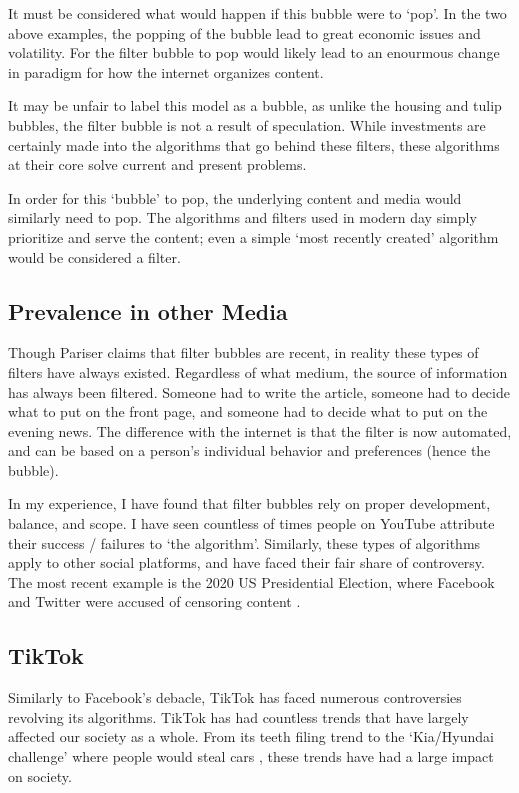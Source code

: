 \documentclass[12pt]{article}
\begin{document}
It must be considered what would happen if this bubble were to `pop'.
In the two above examples, the popping of the bubble lead to great economic
issues and volatility. For the filter bubble to pop would likely lead to
an enourmous change in paradigm for how the internet organizes content.

It may be unfair to label this model as a bubble, as unlike the housing and
tulip bubbles, the filter bubble is not a result of speculation. While
investments are certainly made into the algorithms that go behind these filters,
these algorithms at their core solve current and present problems.

In order for this `bubble' to pop, the underlying content and media would
similarly need to pop. The algorithms and filters used in modern day simply
prioritize and serve the content; even a simple `most recently created' algorithm
would be considered a filter.

\subsection{Prevalence in other Media}
Though Pariser claims that filter bubbles are recent, in reality these types of
filters have always existed. Regardless of what medium, the source of information
has always been filtered. Someone had to write the article, someone had to
decide what to put on the front page, and someone had to decide what to put on
the evening news. The difference with the internet is that the filter is now
automated, and can be based on a person's individual behavior and preferences
(hence the bubble).

In my experience, I have found that filter bubbles rely on proper development,
balance, and scope. I have seen countless of times people on YouTube attribute
their success / failures to `the algorithm'. Similarly, these types of
algorithms apply to other social platforms, and have faced their fair share of
controversy. The most recent example is the 2020 US Presidential Election, where
Facebook and Twitter were accused of censoring content \cite{time2021facebook}.

\subsection{TikTok}
Similarly to Facebook's debacle, TikTok has faced numerous controversies
revolving its algorithms. TikTok has had countless trends that have largely
affected our society as a whole. From its teeth filing trend \cite{wapostteeth}
to the `Kia/Hyundai challenge' where people would steal cars \cite{cnbccars},
these trends have had a large impact on society.
\end{document}

